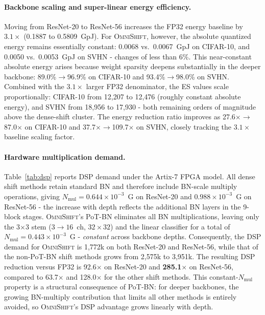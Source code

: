\documentclass[12pt]{article}
\newcommand{\omnishift}{\textsc{OmniShift}}
\begin{document}
\paragraph{Backbone scaling and super-linear energy efficiency.} Moving from ResNet-20 to ResNet-56 increases the FP32 energy baseline by $3.1\times$ (0.1887 to 0.5809~GpJ). For \omnishift{}, however, the absolute quantized energy remains essentially constant: 0.0068 vs.\ 0.0067~GpJ on CIFAR-10, and 0.0050 vs.\ 0.0053~GpJ on SVHN - changes of less than 6\%. This near-constant absolute energy arises because weight sparsity deepens substantially in the deeper backbone: 89.0\%$\to$96.9\% on CIFAR-10 and 93.4\%$\to$98.0\% on SVHN. Combined with the $3.1\times$ larger FP32 denominator, the ES values scale proportionally: CIFAR-10 from 12,207 to 12,476 (roughly constant absolute energy), and SVHN from 18,956 to 17,930 - both remaining orders of magnitude above the dense-shift cluster. The energy reduction ratio improves as 27.6$\times$$\to$87.0$\times$ on CIFAR-10 and 37.7$\times$$\to$109.7$\times$ on SVHN, closely tracking the $3.1\times$ baseline scaling factor.

\paragraph{Hardware multiplication demand.} Table~\ref{tab:dsp} reports DSP demand under the Artix-7 FPGA model. All dense shift methods retain standard BN and therefore include BN-scale multiply operations, giving $N_\text{mul} = 0.644\times10^{-3}$~G on ResNet-20 and $0.988\times10^{-3}$~G on ResNet-56 - the increase with depth reflects the additional BN layers in the 9-block stages. \omnishift{}'s PoT-BN eliminates all BN multiplications, leaving only the 3$\times$3 stem ($3\to16$~ch, $32\times32$) and the linear classifier for a total of $N_\text{mul} = 0.443\times10^{-3}$~G - \emph{constant} across backbone depths. Consequently, the DSP demand for \omnishift{} is 1,772k on both ResNet-20 and ResNet-56, while that of the non-PoT-BN shift methods grows from 2,575k to 3,951k. The resulting DSP reduction versus FP32 is 92.6$\times$ on ResNet-20 and \textbf{285.1$\times$} on ResNet-56, compared to 63.7$\times$ and 128.0$\times$ for the other shift methods. This constant-$N_\text{mul}$ property is a structural consequence of PoT-BN: for deeper backbones, the growing BN-multiply contribution that limits all other methods is entirely avoided, so \omnishift{}'s DSP advantage grows linearly with depth.
\end{document}
